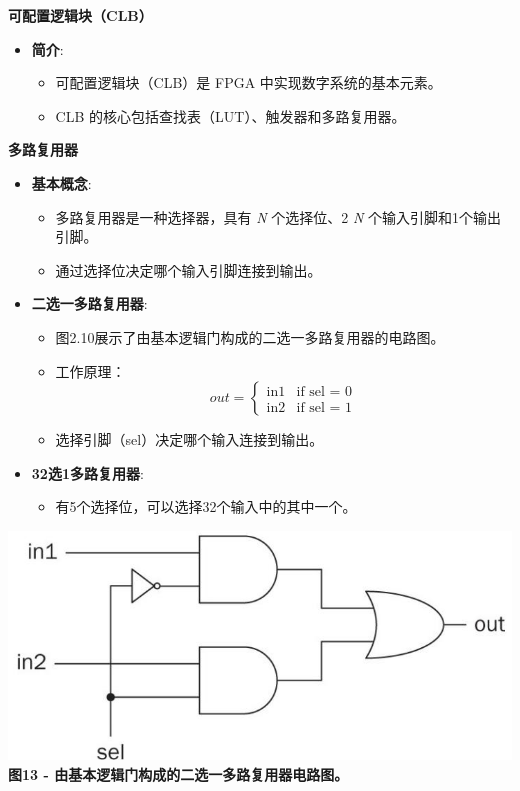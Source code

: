 \begin{frame}[allowframebreaks]{\textbf{可配置逻辑块（CLB）}}
\begin{itemize}
\tightlist
\item
    \textbf{简介}:

    \begin{itemize}
    \tightlist
    \item
    可配置逻辑块（CLB）是 FPGA 中实现数字系统的基本元素。
    \item
    CLB 的核心包括查找表（LUT）、触发器和多路复用器。
    \end{itemize}
\end{itemize}

\begin{block}{\textbf{多路复用器}}
\begin{itemize}
\tightlist
\item
    \textbf{基本概念}:

    \begin{itemize}
    \tightlist
    \item
    多路复用器是一种选择器，具有 \emph{N} 个选择位、2 \emph{N}
    个输入引脚和1个输出引脚。
    \item
    通过选择位决定哪个输入引脚连接到输出。
    \end{itemize}
\item
    \textbf{二选一多路复用器}:

    \begin{itemize}
    \tightlist
    \item
    图2.10展示了由基本逻辑门构成的二选一多路复用器的电路图。
    \item
    工作原理：
    \[out = \begin{cases} \text{in1} & \text{if sel = 0} \\ \text{in2} & \text{if sel = 1} \end{cases} \tag{2.4}\]
    \item
    选择引脚（sel）决定哪个输入连接到输出。
    \end{itemize}
\item
    \textbf{32选1多路复用器}:

    \begin{itemize}
    \tightlist
    \item
    有5个选择位，可以选择32个输入中的其中一个。
    \end{itemize}
\end{itemize}

\includegraphics[keepaspectratio]{img1/XC7A35TMUX.jpeg}\\
\textbf{图13 - 由基本逻辑门构成的二选一多路复用器电路图。}
\end{block}


\end{frame}
